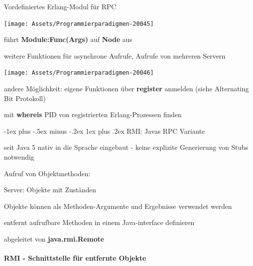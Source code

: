 \documentclass[10pt]{article}
\makeatletter
\renewcommand{\subsubsection}{\@startsection{subsubsection}{3}{0mm}%
                                {-1ex plus -.5ex minus -.2ex}%
                                {1ex plus .2ex}%
                                {\normalfont\small\bfseries}}
\makeatother
\begin{document}
\begin{itemize*}
  \item Vordefiniertes Erlang-Modul für RPC
  \begin{center}
    \centering
    \texttt{[image: Assets/Programmierparadigmen-20045]}
  \end{center}
  \item führt \textbf{Module:Func(Args)} auf \textbf{Node} aus
  \begin{itemize*}
    \item weitere Funktionen für asynchrone Aufrufe, Aufrufe von mehreren Servern
  \end{itemize*}
  \begin{center}
    \centering
    \texttt{[image: Assets/Programmierparadigmen-20046]}
  \end{center}
  \item andere Möglichkeit: eigene Funktionen über \textbf{register} anmelden (siehe Alternating Bit Protokoll)
  \item mit \textbf{whereis} PID von registrierten Erlang-Prozessen finden
\end{itemize*}

\subsubsection{RMI: Javas RPC Variante}
\begin{itemize*}
  \item seit Java 5 nativ in die Sprache eingebaut - keine explizite Generierung von Stubs notwendig
  \item Aufruf von Objektmethoden:
  \begin{itemize*}
    \item Server: Objekte mit Zuständen
    \item Objekte können als Methoden-Argumente und Ergebnisse verwendet werden
  \end{itemize*}
  \item entfernt aufrufbare Methoden in einem Java-interface definieren
  \begin{itemize*}
    \item abgeleitet von \textbf{java.rmi.Remote}
  \end{itemize*}
\end{itemize*}

\paragraph{RMI - Schnittstelle für entfernte Objekte}
\end{document}
